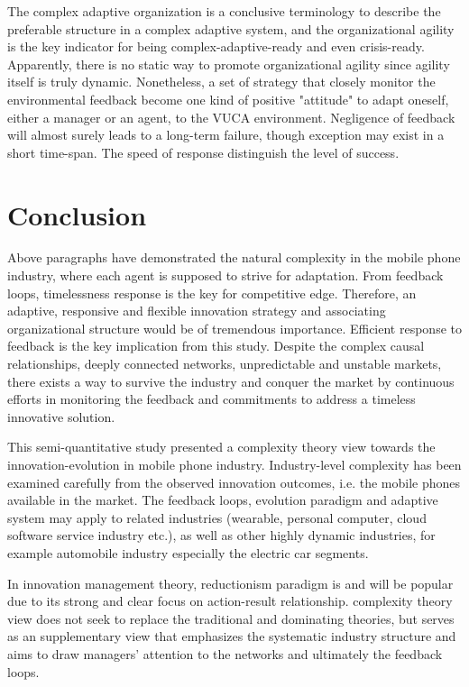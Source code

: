 \documentclass[utf8,english]{gradu3}
\begin{document}
The complex adaptive organization is a conclusive terminology to describe the preferable structure in a complex adaptive system, and the organizational agility is the key indicator for being complex-adaptive-ready and even crisis-ready. Apparently, there is no static way to promote organizational agility since agility itself is truly dynamic. Nonetheless, a set of strategy that closely monitor the environmental feedback become one kind of positive "attitude" to adapt oneself, either a manager or an agent, to the VUCA environment. Negligence of feedback will almost surely leads to a long-term failure, though exception may exist in a short time-span. The speed of response distinguish the level of success.

\chapter{Conclusion}

Above paragraphs have demonstrated the natural complexity in the mobile phone industry, where each agent is supposed to strive for adaptation. From feedback loops, timelessness response is the key for competitive edge. Therefore, an adaptive, responsive and flexible innovation strategy and associating organizational structure would be of tremendous importance. Efficient response to feedback is the key implication from this study. Despite the complex causal relationships, deeply connected networks, unpredictable and unstable markets, there exists a way to survive the industry and conquer the market by continuous efforts in monitoring the feedback and commitments to address a timeless innovative solution. 

This semi-quantitative study presented a complexity theory view towards the innovation-evolution in mobile phone industry. Industry-level complexity has been examined carefully from the observed innovation outcomes, i.e. the mobile phones available in the market. The feedback loops, evolution paradigm and adaptive system may apply to related industries (wearable, personal computer, cloud software service industry etc.), as well as other highly dynamic industries, for example automobile industry especially the electric car segments. 

In innovation management theory, reductionism paradigm is and will be popular due to its strong and clear focus on action-result relationship. complexity theory view does not seek to replace the traditional and dominating theories, but serves as an supplementary view that emphasizes the systematic industry structure and aims to draw managers' attention to the networks and ultimately the feedback loops.
\end{document}

